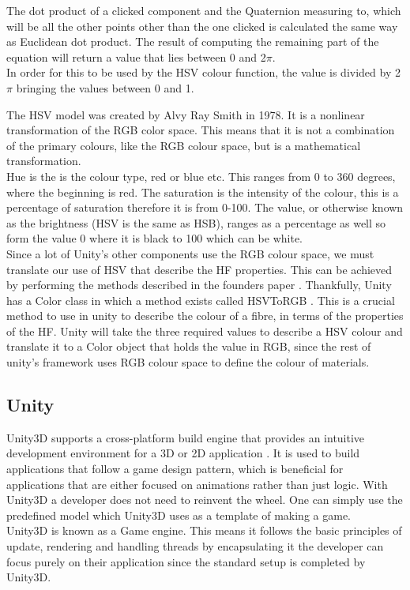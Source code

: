 \documentclass[12pt]{article} %
\begin{document}
\begin{flushleft}
The dot product of a clicked component and the Quaternion measuring to, which will be all the other points other than the one clicked is calculated the same way as Euclidean dot product. The result of computing the remaining part of the equation will return a value that lies between 0 and 2$\pi$. \\
In order for this to be used by the HSV colour function, the value is divided by 2$\pi$ bringing the values between 0 and 1.

The HSV model was created by Alvy Ray Smith in 1978. It is a nonlinear transformation of the RGB color space. 
This means that it is not a combination of the primary colours, like the RGB colour space, but is a mathematical transformation.\\
Hue is the is the colour type, red or blue etc. This ranges from 0 to 360 degrees, where the beginning is red. The saturation is the intensity of the colour, this is a percentage of saturation therefore it is from 0-100. The value, or otherwise known as the brightness (HSV is the same as HSB), ranges as a percentage as well so form the value 0 where it is black to 100  which can be white.\\
Since a lot of Unity's other components use the RGB colour space, we must translate our use of HSV that describe the HF properties. This can be achieved by performing the methods described in the founders paper \cite{Smith:bre}.
Thankfully, Unity has a Color class in which a method exists called HSVToRGB \cite{unity:scriptingcolour}. This is a crucial method to use in unity to describe the colour of a fibre, in terms of the properties of the HF. Unity will take the three required values to describe a HSV colour and translate it to a Color object that holds the value in RGB, since the rest of unity's framework uses RGB colour space to define the colour of materials. 
\subsection{Unity} %
Unity3D supports a cross-platform build engine that provides an intuitive development environment for a 3D or 2D application \cite{unity:manual}. It is used to build applications that follow a game design pattern, which is beneficial for applications that are either focused on animations rather than just logic. With Unity3D a developer does not need to reinvent the wheel. One can simply use the predefined model which Unity3D uses as a template of making a game. \\
Unity3D is known as a Game engine. This means it follows the basic principles of update, rendering and handling threads by encapsulating it the developer can focus purely on their application since the standard setup is completed by Unity3D. 

\end{flushleft}
\end{document}
